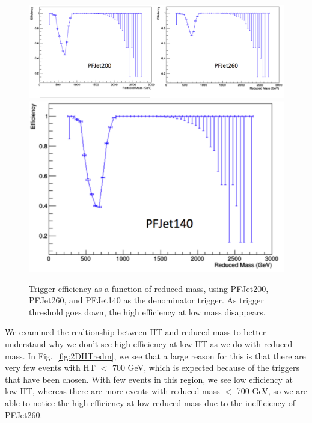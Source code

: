 \begin{figure}[thb!]
\begin{center}
\includegraphics[scale=0.35]{Figures/lowertrig1.pdf}\\
\includegraphics[scale=0.35]{Figures/lowertrig2.pdf}
\end{center}
\caption{Trigger efficiency as a function of reduced mass, using PFJet200, PFJet260, and PFJet140 as the denominator trigger. As trigger threshold goes down, the high efficiency at low mass disappears.}
\label{fig:lowPTtrig}
\end{figure}

We examined the realtionship between HT and reduced mass to better understand why we don't see high efficiency at low HT as we do with reduced mass. In Fig.~\ref{fig:2DHTredm}, we see that a large reason for this is that there are very few events with HT $<$ 700 GeV, which is expected because of the triggers that have been chosen. With few events in this region, we see low efficiency at low HT, whereas there are more events with reduced mass $<$ 700 GeV, so we are able to notice the high efficiency at low reduced mass due to the inefficiency of PFJet260.

